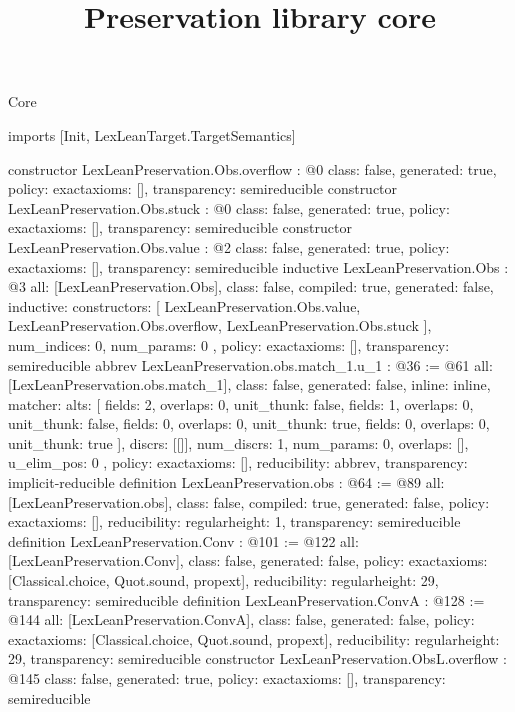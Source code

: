 \begin{lexlean}{Core}
\title{Preservation library core}
\begin{coremodule}
imports [Init, LexLeanTarget.TargetSemantics]

constructor LexLeanPreservation.Obs.overflow : @0 {
  class: false,
  generated: true,
  policy: exact{axioms: []},
  transparency: semireducible
}
constructor LexLeanPreservation.Obs.stuck : @0 {
  class: false,
  generated: true,
  policy: exact{axioms: []},
  transparency: semireducible
}
constructor LexLeanPreservation.Obs.value : @2 {
  class: false,
  generated: true,
  policy: exact{axioms: []},
  transparency: semireducible
}
inductive LexLeanPreservation.Obs : @3 {
  all: [LexLeanPreservation.Obs],
  class: false,
  compiled: true,
  generated: false,
  inductive: {
    constructors: [
      LexLeanPreservation.Obs.value,
      LexLeanPreservation.Obs.overflow,
      LexLeanPreservation.Obs.stuck
    ],
    num_indices: 0,
    num_params: 0
  },
  policy: exact{axioms: []},
  transparency: semireducible
}
abbrev LexLeanPreservation.obs.match_1.{u_1} : @36 := @61 {
  all: [LexLeanPreservation.obs.match_1],
  class: false,
  generated: false,
  inline: inline,
  matcher: {
    alts: [
      {fields: 2, overlaps: 0, unit_thunk: false},
      {fields: 1, overlaps: 0, unit_thunk: false},
      {fields: 0, overlaps: 0, unit_thunk: true},
      {fields: 0, overlaps: 0, unit_thunk: true}
    ],
    discrs: [[]],
    num_discrs: 1,
    num_params: 0,
    overlaps: [],
    u_elim_pos: 0
  },
  policy: exact{axioms: []},
  reducibility: abbrev{},
  transparency: implicit-reducible
}
definition LexLeanPreservation.obs : @64 := @89 {
  all: [LexLeanPreservation.obs],
  class: false,
  compiled: true,
  generated: false,
  policy: exact{axioms: []},
  reducibility: regular{height: 1},
  transparency: semireducible
}
definition LexLeanPreservation.Conv : @101 := @122 {
  all: [LexLeanPreservation.Conv],
  class: false,
  generated: false,
  policy: exact{axioms: [Classical.choice, Quot.sound, propext]},
  reducibility: regular{height: 29},
  transparency: semireducible
}
definition LexLeanPreservation.ConvA : @128 := @144 {
  all: [LexLeanPreservation.ConvA],
  class: false,
  generated: false,
  policy: exact{axioms: [Classical.choice, Quot.sound, propext]},
  reducibility: regular{height: 29},
  transparency: semireducible
}
constructor LexLeanPreservation.ObsL.overflow : @145 {
  class: false,
  generated: true,
  policy: exact{axioms: []},
  transparency: semireducible
}
\end{coremodule}
\end{lexlean}
